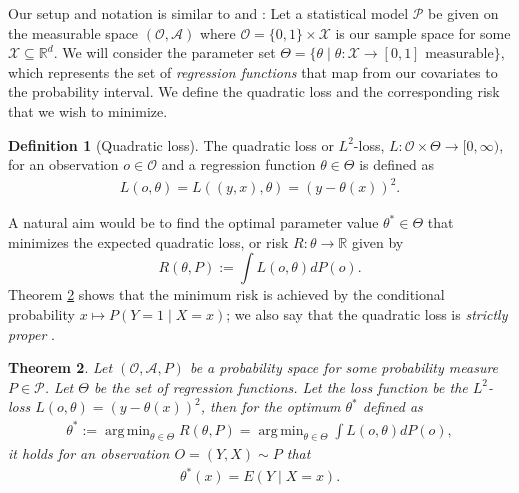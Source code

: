 \documentclass[11pt, a4paper]{article}
\DeclareMathOperator*{\argmin}{arg\,min}
\newtheorem{theorem}{Theorem}
\theoremstyle{definition}
\newtheorem{definition}[theorem]{Definition}
\theoremstyle{remark}
\newcommand{\btheta}{\theta}
\begin{document}
Our setup and notation is similar to \cite{vaart06} and \cite{laan03}:
Let a statistical model $ \mathcal{P} $ be given on the measurable space $ (\mathcal{O}, \mathcal{A}) $ where $ \mathcal{O} = \{0,1\} \times \mathcal{X} $ is our sample space for some $ \mathcal{X} \subseteq \mathbb{R}^{d} $. 
We will consider the parameter set $ \Theta = \{\btheta \mid \btheta : \mathcal{X} \to [0,1] \text{ measurable}\} $, which represents the set of \textit{regression functions} that map from our covariates to the probability interval. We define the quadratic loss and the corresponding risk that we wish to minimize.
\begin{definition}[Quadratic loss]
    The quadratic loss or $ L^2 $-loss, $ L : \mathcal{O} \times \Theta \to [0, \infty) $, for an observation $ o \in \mathcal{O} $ and a regression function $ \btheta \in \Theta $ is defined as 
\begin{align*}
    L(o, \btheta) = L((y,x), \btheta) = (y - \btheta(x))^2.
\end{align*}
\end{definition}
A natural aim would be to find the optimal parameter value $\btheta^* \in \Theta$ that minimizes the expected quadratic loss, or risk $R: \btheta \to \mathbb{R}$ given by 
\begin{equation} \label{l2risk}
    R(\btheta, P) := \int L(o, \btheta)  dP(o).
\end{equation}
Theorem \ref{minrisk} shows that the minimum risk is achieved by the conditional probability $ x \mapsto P(Y = 1\mid X = x) $; we also say that the quadratic loss is \textit{strictly proper} \parencite{gneiting2007strictly}. 
\begin{theorem} \label{minrisk}
    Let $ (\mathcal{O} , \mathcal{A}, P) $ be a probability space for some probability measure $ P \in \mathcal{P} $. Let $ \Theta $ be the set of regression functions. Let the loss function be the $ L^2 $-loss $ L(o, \btheta) = (y - \btheta(x))^2 $, then for the optimum $ \btheta^* $ defined as 
    \begin{align*}
        \btheta^* := \argmin_{\btheta \in \Theta} R(\btheta, P)= \argmin_{\btheta \in \Theta} \int L(o, \btheta)  dP(o),
    \end{align*}
    it holds for an observation $ O = (Y, X) \sim P $ that
    \begin{align*}
        \btheta^{*}(x) = E(Y \mid X = x).
    \end{align*}
\end{theorem}
\end{document}
